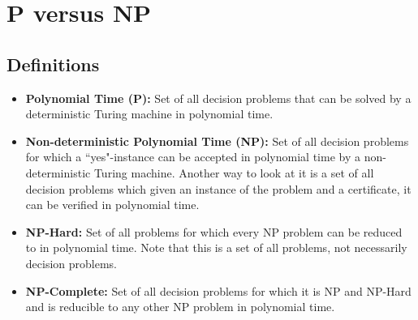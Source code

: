 \chapter{P versus NP}
\newpage

\section{Definitions}
\begin{itemize} 
	\item \textbf{Polynomial Time (P): } Set of all decision problems that can be solved by a deterministic Turing machine in polynomial time.
	\item \textbf{Non-deterministic Polynomial Time (NP): } Set of all decision problems for which a ``yes"-instance can be accepted in polynomial time by a non-deterministic Turing machine. Another way to look at it is a set of all decision problems which given an instance of the problem and a certificate, it can be verified in polynomial time. 
	\item \textbf{NP-Hard: } Set of all problems for which every NP problem can be reduced to in polynomial time. Note that this is a set of all problems, not necessarily decision problems.
	\item \textbf{NP-Complete: } Set of all decision problems for which it is NP and NP-Hard and is reducible to any other NP problem in polynomial time.
\end{itemize}